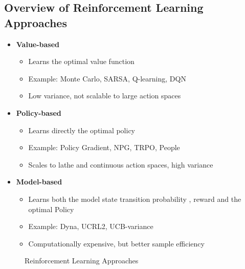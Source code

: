 \subsection{Overview of Reinforcement Learning Approaches}
\begin{itemize}
\item \textbf{Value-based}
    \begin{itemize}
        \item Learns the optimal value function
        \item Example: Monte Carlo, SARSA, Q-learning, DQN
        \item \bred Low variance, not scalable to large action spaces \ered
    \end{itemize}
\item \textbf{Policy-based}
    \begin{itemize}
        \item Learns directly the optimal policy
        \item Example: Policy Gradient, NPG, TRPO, People
        \item \bred Scales to lathe and continuous action spaces, high variance \ered
    \end{itemize}
\item \textbf{Model-based}
    \begin{itemize}
        \item Learns both the model state transition probability , reward and the optimal Policy
        \item Example: Dyna, UCRL2, UCB-variance
        \item \bred Computationally expensive, but better sample efficiency \ered
    \end{itemize}
\end{itemize}

\begin{figure}
    \centering
    \caption{Reinforcement Learning Approaches}
    \label{fig:rl-approaches}
\end{figure}

